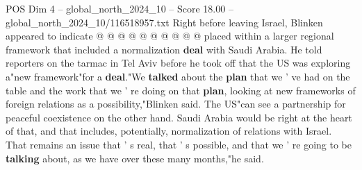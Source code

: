 \begin{textsample}{POS Dim 4 – global\_north\_2024\_10 – Score 18.00 – global\_north\_2024\_10/116518957.txt}
Right before leaving Israel, Blinken appeared to indicate @ @ @ @ @ @ @ @ @ @ placed within a larger regional framework that included a normalization \textbf{deal} with Saudi Arabia.
He told reporters on the tarmac in Tel Aviv before he took off that the US was exploring a"new framework"for a \textbf{deal}."We \textbf{talked} about the \textbf{plan} that we ' ve had on the table and the work that we ' re doing on that \textbf{plan}, looking at new frameworks of foreign relations as a possibility,"Blinken said.
The US"can see a partnership for peaceful coexistence on the other hand.
Saudi Arabia would be right at the heart of that, and that includes, potentially, normalization of relations with Israel.
That remains an issue that ' s real, that ' s possible, and that we ' re going to be \textbf{talking} about, as we have over these many months,"he said.

\end{textsample}
